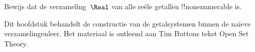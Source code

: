 \documentclass[openany]{memoir}
\begin{document}
\begin{prob}
Bewijs dat de verzameling~$\Real$ van alle reële getallen
!!{nonenumerable} is.
\end{prob}
\endgroup
\OLEndChapterHook

\begingroup
\def\olfilename{OLP-0041}
\def\olfilepath{content/sets-functions-relations/arithmetization/}
\hypertarget{unit-OLP-0041}{}


	

\begin{editorial}
Dit hoofdstuk behandelt de constructie van de getalsystemen binnen de
na\"ieve verzamelingenleer. Het materiaal is ontleend aan Tim Buttons
tekst Open Set Theory.
\end{editorial}
\endgroup

\begingroup
\def\olfilename{OLP-0042}
\def\olfilepath{content/sets-functions-relations/arithmetization/}
\hypertarget{unit-OLP-0042}{}
\end{document}
